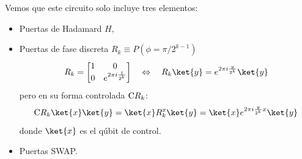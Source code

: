 \documentclass[a4paper,11pt]{book} %
\numberwithin{equation}{chapter}
\newcommand{\cg}[1]{{\rm C}#1}
\begin{document}
Vemos que este circuito solo incluye tres elementos:
\begin{itemize}
	\item Puertas de Hadamard $H$,
	\item Puertas de fase discreta $R_k \equiv P (\phi = \pi/2^{k-1})$
		\begin{equation}
		R_k = \begin{bmatrix}
		1 & 0 \\ 0 & e^{2 \pi i \frac{1}{2^k}}
		\end{bmatrix} \quad \Leftrightarrow \quad R_k \ket{y} = e^{2 \pi i \frac{y}{2^k}} \ket{y}
		\end{equation}
		pero en su forma controlada $\cg{R_k}$:
			\begin{equation} \label{ec_QFT_CRk}
			\cg{R_k}\ket{x}\ket{y} = \ket{x}R^{x}_{k}\ket{y}  = \ket{x}  e^{2 \pi i   \frac{y}{2^{k}}x}\ket{y}
			\end{equation}
		donde $\ket{x}$ es el qúbit de control.
	\item Puertas SWAP.
\end{itemize}
\end{document}

